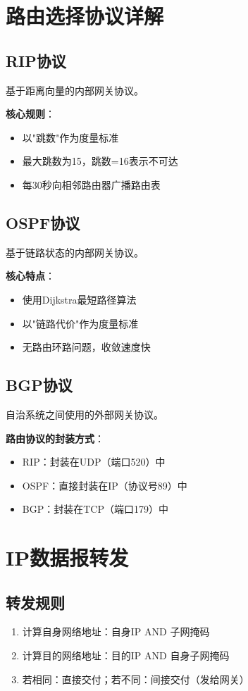 \section{路由选择协议详解}
\subsection{RIP协议}
基于距离向量的内部网关协议。

\textbf{核心规则}：
\begin{itemize}[leftmargin=2em,itemsep=0pt]
    \item 以"跳数"作为度量标准
    \item 最大跳数为15，跳数=16表示不可达
    \item 每30秒向相邻路由器广播路由表
\end{itemize}

\subsection{OSPF协议}
基于链路状态的内部网关协议。

\textbf{核心特点}：
\begin{itemize}[leftmargin=2em,itemsep=0pt]
    \item 使用Dijkstra最短路径算法
    \item 以"链路代价"作为度量标准
    \item 无路由环路问题，收敛速度快
\end{itemize}

\subsection{BGP协议}
自治系统之间使用的外部网关协议。

\begin{notebox}
\textbf{路由协议的封装方式}：
\begin{itemize}[itemsep=0pt]
    \item RIP：封装在UDP（端口520）中
    \item OSPF：直接封装在IP（协议号89）中
    \item BGP：封装在TCP（端口179）中
\end{itemize}
\end{notebox}

\section{IP数据报转发}
\subsection{转发规则}
\begin{enumerate}[leftmargin=2em,itemsep=0pt]
    \item 计算自身网络地址：自身IP AND 子网掩码
    \item 计算目的网络地址：目的IP AND 自身子网掩码
    \item 若相同：直接交付；若不同：间接交付（发给网关）
\end{enumerate}

